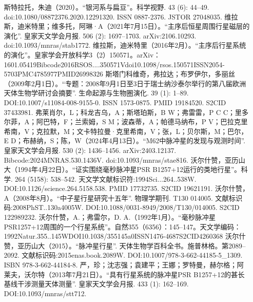 斯特拉托，朱迪（2020）。“银河系与扁豆”。科学视野. 43 (6): 44–49. doi:10.1080/08872376.2020.12291320. ISSN 0887-2376. JSTOR 27048035.
维拉斯，迪米特里；维多托，阿琳·A（2021年7月15日）。“主序后恒星周围行星磁层的演化”. 皇家天文学会月报. 506 (2): 1697–1703. arXiv:2106.10293. doi:10.1093/mnras/stab1772.
维拉斯，迪米特里（2016年2月）。“主序后行星系统的演化”。皇家学会开放科学3（2）150571。arXiv：1601.05419Bibcode2016RSOS....350571Vdoi10.1098/rsos.150571ISSN2054-5703PMC4785977PMID26998326
斯塔门科维奇，弗拉达；布罗伊尔，多丽丝（2009年2月1日）。“专题：2008年9月1日至3日于瑞士纳沙泰尔举行的第八届欧洲天体生物学研讨会摘要”. 生命起源与生物圈演化. 39 (1): 1–89. DOI:10.1007/s11084-008-9155-0. ISSN 1573-0875. PMID 19184520. S2CID 37433981.
弗莱肖尔，L；科龙吉乌，A；斯塔珀斯，B W；弗雷雷，P C C；里多尔菲，A；阿巴特，F；兰索姆，S M；波森蒂，A；帕德马纳布，P V；巴拉克里希南，V；克拉默，M；文卡特拉曼·克里希南，V；张，L；贝尔斯，M；巴尔，E D；布赫纳，S；陈，W（2024年4月13日）。“M62中脉冲星的发现与观测时间”. 皇家天文学会月报. 530 (2): 1436–1456. arXiv:2403.12137. Bibcode:2024MNRAS.530.1436V. doi:10.1093/mnras/stae816.
沃尔什赞，亚历山大（1994年4月22日）。“证实围绕毫秒脉冲星PSR B1257+12运行的类地行星”。科学. 264 (5158): 538–542. 天文学文献标识符:1994Sci...264..538W. DOI:10.1126/science.264.5158.538. PMID 17732735. S2CID 19621191.
沃尔什赞，A（2008年8月）。“中子星行星研究十五年”. 物理学期刊. T130 014005. 文献标识码:2008PhST..130a4005W. DOI:10.1088/0031-8949/2008/T130/014005. S2CID 122989232.
沃尔什赞，A.；弗雷尔，D. A.（1992年1月）。“毫秒脉冲星PSR1257+12周围的一个行星系统”。自然355（6356）：145–147。天文学编码：1992Natur.355..145WDOI10.1038/355145a0ISSN1476-4687S2CID4260368
沃尔什赞，亚历山大（2015）。“脉冲星行星”. 天体生物学百科全书。施普林格。第2089–2092. 文献标识码:2015enas.book.2089W. DOI:10.1007/978-3-662-44185-5_1309. ISBN 978-3-662-44184-8.
严，珍；沈志强；袁建平；王娜；罗特曼，赫尔格；阿莱夫，沃尔特（2013年7月21日）。“具有行星系统的脉冲星PSR B1257+12的甚长基线干涉测量天体测量”. 皇家天文学会月报. 433 (1): 162–169. DOI:10.1093/mnras/stt712.